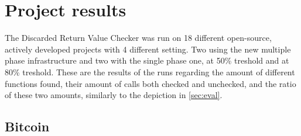 \chapter{Project results}
\label{appx:diagrams}

The Discarded Return Value Checker was run on 18 different open-source, actively developed projects with 4 different setting.
Two using the new multiple phase infrastructure and two with the single phase one, at 50\% treshold and at 80\% treshold.
These are the results of the runs regarding the amount of different functions found, their amount of calls both checked
and unchecked, and the ratio of these two amounts, similarly to the depiction in \cref{sec:eval}.
\pagebreak

\section*{Bitcoin}

\begin{figure}[H]
\end{figure}

\begin{figure}[H]
\end{figure}

